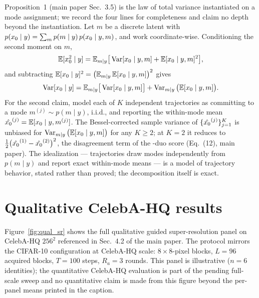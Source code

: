 \documentclass[10pt,twocolumn,letterpaper]{article}
\begin{document}
Proposition~1 (main paper Sec.~3.5) is the law of total variance
instantiated on a mode assignment; we record the four lines for
completeness and claim no depth beyond the instantiation. Let $m$ be a
discrete latent with
$p(x_0 \mid y) = \sum_m p(m \mid y)\, p(x_0 \mid y, m)$, and work
coordinate-wise. Conditioning the second moment on $m$,
\begin{equation}
  \mathbb{E}[x_0^2 \mid y]
  = \mathbb{E}_{m \mid y}\big[\operatorname{Var}[x_0 \mid y, m]
    + \mathbb{E}[x_0 \mid y, m]^2\big],
  \label{eq:supp_ltv1}
\end{equation}
and subtracting
$\mathbb{E}[x_0 \mid y]^2 = \big(\mathbb{E}_{m \mid y}\,
\mathbb{E}[x_0 \mid y, m]\big)^2$ gives
\begin{equation}
  \operatorname{Var}[x_0 \mid y]
  = \mathbb{E}_{m \mid y}\big[\operatorname{Var}[x_0 \mid y, m]\big]
  + \operatorname{Var}_{m \mid y}\big(\mathbb{E}[x_0 \mid y, m]\big).
  \label{eq:supp_ltv2}
\end{equation}
For the second claim, model each of $K$ independent trajectories as
committing to a mode $m^{(j)} \sim p(m \mid y)$, i.i.d., and reporting
the within-mode mean $\hat{x_0}^{(j)} = \mathbb{E}[x_0 \mid y, m^{(j)}]$.
The Bessel-corrected sample variance of
$\{\hat{x_0}^{(j)}\}_{j=1}^{K}$ is unbiased for
$\operatorname{Var}_{m \mid y}\big(\mathbb{E}[x_0 \mid y, m]\big)$ for
any $K \ge 2$; at $K{=}2$ it reduces to
$\tfrac{1}{2}\big(\hat{x_0}^{(1)} - \hat{x_0}^{(2)}\big)^2$, the
disagreement term of the \pvas-duo score (Eq.~(12), main paper). The
idealization --- trajectories draw modes independently from
$p(m \mid y)$ and report exact within-mode means --- is a model of
trajectory behavior, stated rather than proved; the decomposition
itself is exact.

\section{Qualitative CelebA-HQ results}\label{sec:supp_celeba}

Figure~\ref{fig:qual_sr} shows the full qualitative guided
super-resolution panel on CelebA-HQ $256^2$ referenced in Sec.~4.2 of
the main paper. The protocol mirrors the CIFAR-10 configuration at
CelebA-HQ scale: $8{\times}8$-pixel blocks, $L{=}96$ acquired blocks,
$T{=}100$ steps, $R_a{=}3$ rounds. This panel is illustrative
($n{=}6$ identities); the quantitative CelebA-HQ evaluation is part of
the pending full-scale sweep and no quantitative claim is made from
this figure beyond the per-panel means printed in the caption.
\end{document}
